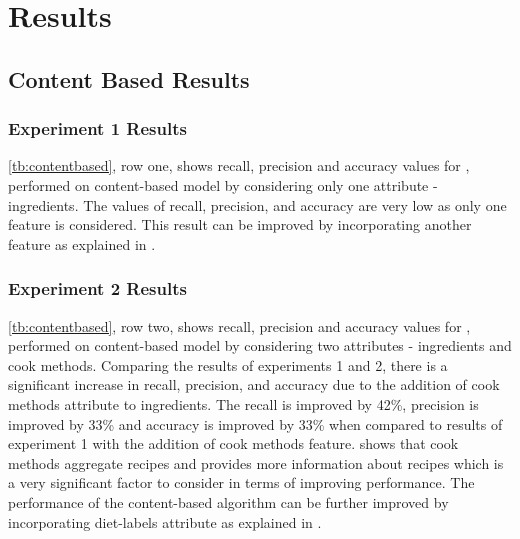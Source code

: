 \chapter{Results}
\label{ch:results}
\section{Content Based Results}
\subsection{Experiment 1 Results}
\label{sec:res1}
\autoref{tb:contentbased}, row one, shows recall, precision and accuracy values for , performed on content-based model by considering only one attribute - ingredients. The values of recall, precision, and accuracy are very low as only one feature is considered. This result can be improved by incorporating another feature as explained in .

\subsection{Experiment 2 Results}
\label{sec:res2}
\autoref{tb:contentbased}, row two, shows recall, precision and accuracy values for , performed on content-based model by considering two attributes - ingredients and cook methods. Comparing the results of experiments 1 and 2, there is a significant increase in recall, precision, and accuracy due to the addition of cook methods attribute to ingredients. The recall is improved by 42\%, precision is improved by 33\% and accuracy is improved by 33\% when compared to results of experiment 1 with the addition of cook methods feature.  shows that cook methods aggregate recipes and provides more information about recipes which is a very significant factor to consider in terms of improving performance. The performance of the content-based algorithm can be further improved by incorporating diet-labels attribute as explained in .

